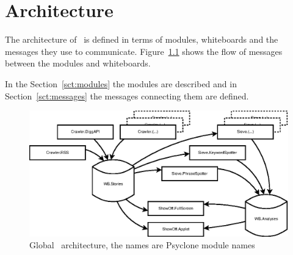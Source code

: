 \chapter{\label{cpt:architecture}Architecture}

The architecture of \Amber\ is defined in terms of modules, whiteboards and the
messages they use to communicate. Figure~\ref{fig:global-architecture} shows
the flow of messages between the modules and whiteboards.

In the Section~\ref{sct:modules} the modules are described and in
Section~\ref{sct:messages} the messages connecting them are defined. %

\begin{figure}
    \centering
    \includegraphics{design/image/global-architecture}
    \caption{\label{fig:global-architecture}Global \Amber\ architecture, the
              names are Psyclone module names}
\end{figure}





% 


